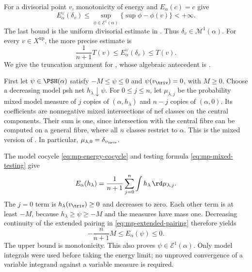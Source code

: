 \begin{example}
\label{ex:mpwn-divisorial-dirac}
For a divisorial point $v$, monotonicity of energy and
$E_\alpha(c)=c$ give
\[
 E_\alpha^\vee(\delta_v)
 \leq\sup_{\phi\in\mathcal E^1(\alpha)}
          \{\sup\phi-\phi(v)\}<+\infty.
\tag{61.9}\label{eq:mpwn-dirac-energy-bound}
\]
The last bound is the uniform divisorial estimate in
.  Thus
$\delta_v\in\mathcal M^1(\alpha)$.
For every $v\in X^{\mathrm{np}}$, the more precise estimate is
\[
              \frac1{n+1}T(v)
              \leq E_\alpha^\vee(\delta_v)\leq T(v).
\tag{61.10}\label{eq:mpwn-point-energy}
\]
We give the truncation argument for
\cite[Proposition~3.2.3]{MPWN25}, whose algebraic antecedent is
\cite[proof of Proposition~11.1, (11.3)]{BJ22}.

First let $\psi\in\PSH(\alpha)$ satisfy
$-M\leq\psi\leq0$ and $\psi(v_{\triv})=0$, with $M\geq0$.
Choose a decreasing model psh net $h_\lambda\downarrow\psi$.
For $0\leq j\leq n$, let $\mu_{\lambda,j}$ be the probability
mixed model measure of $j$ copies of $(\alpha,h_\lambda)$
and $n-j$ copies of $(\alpha,0)$.
Its coefficients are nonnegative mixed intersections of nef
classes on the central components.  Their sum is one, since
intersection with the central fibre can be computed on a
general fibre, where all $n$ classes restrict to $\alpha$.
This is the mixed version of .
In particular, $\mu_{\lambda,0}=\delta_{v_{\triv}}$.

The model cocycle \eqref{eq:mp-energy-cocycle} and testing formula
\eqref{eq:mp-mixed-testing} give
\[
 E_\alpha(h_\lambda)
     =\frac1{n+1}\sum_{j=0}^n
                      \int h_\lambda\,\rd\mu_{\lambda,j}.
\]
The $j=0$ term is $h_\lambda(v_{\triv})\geq0$ and decreases to
zero.  Each other term is at least $-M$, because
$h_\lambda\geq\psi\geq-M$ and the measures have mass one.
Decreasing continuity of the extended pairing in
\eqref{eq:mp-extended-pairing} therefore yields
\[
                 -\frac{n}{n+1}M
                        \leq E_\alpha(\psi)\leq0.
\tag{61.10a}\label{eq:mpwn-bounded-energy-floor}
\]
The upper bound is monotonicity.  This also proves
$\psi\in\mathcal E^1(\alpha)$.
Only model integrals were used before taking the energy limit;
no unproved convergence of a variable integrand against a
variable measure is required.


\end{example}
